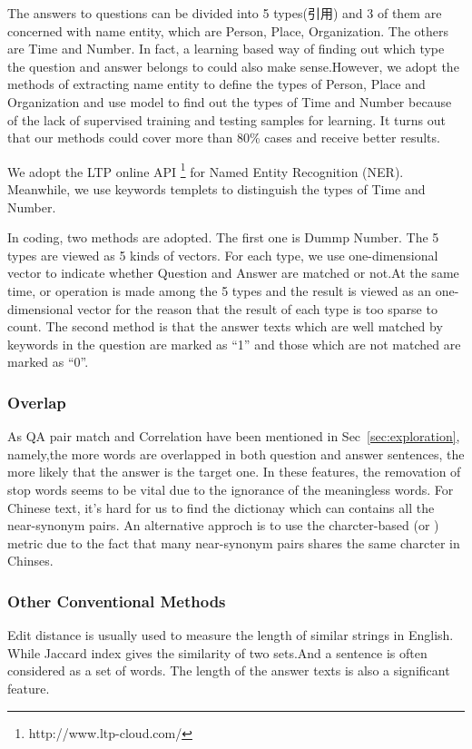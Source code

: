 \documentclass{llncs}
\begin{document}
The answers to questions can be divided into 5 types(引用) and 3 of them are concerned with name entity, which are Person, Place, Organization. The others are Time and Number. In fact, a learning based way of finding out which type the question and answer belongs to could also make sense.However, we adopt the methods of extracting name entity to define the types of Person, Place and Organization and use model to find out the types of Time and Number because of the lack of supervised training and testing samples for learning. It turns out that our methods could cover more than 80\% cases and receive better results.

We adopt the LTP online API \footnote{http://www.ltp-cloud.com/} for Named Entity Recognition (NER). Meanwhile, we use keywords templets to distinguish the types of Time and Number.

In coding, two methods are adopted. The first one is Dummp Number. The 5 types are viewed as 5 kinds of vectors. For each type, we use one-dimensional vector to indicate whether Question and Answer are matched or not.At the same time, or operation is made among the 5 types and the result is viewed as an one-dimensional vector for the reason that the result of each type is too sparse to count. The second method is that the answer texts which are well matched by keywords in the question are marked as “1” and those which are not matched are marked as “0”.


\subsubsection{Overlap}
As QA pair match and Correlation have been mentioned in Sec~\ref{sec:exploration}, namely,the more words are overlapped in both question and answer sentences, the more likely that the answer is the target one.
In these features, the removation of stop words seems to be vital due to the ignorance of the meaningless words. For Chinese text, it's hard for us to find the dictionay which can contains all the near-synonym pairs. An alternative approch is to use the charcter-based (or ) metric due to the fact that many near-synonym pairs shares the same charcter in Chinses. 


\subsubsection{Other Conventional Methods}
Edit distance is usually used to measure the length of similar strings in English. While Jaccard index gives the similarity of two sets.And a sentence is often considered as a set of words.
The length of the answer texts is also a significant feature.
\end{document}
